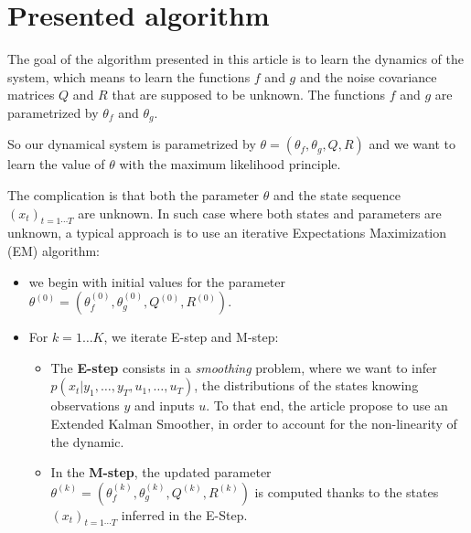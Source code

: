 \section{Presented algorithm}

The goal of the algorithm presented in this article is to learn the dynamics of the system, which means to learn the functions $f$ and $g$  and the noise covariance matrices $Q$ and $R$ that are supposed to be unknown.
The functions $f$ and $g$ are parametrized by $\theta_f$ and $\theta_g$.

So our dynamical system is parametrized by $\theta = \left(\theta_f, \theta_g, Q, R \right)$ and we want to learn the value of $\theta$ with the maximum likelihood principle.

The complication is that both the parameter $\theta$ and the state sequence $(x_t)_{t=1 \cdots T}$ are unknown.
In such case where both states and parameters are unknown, a typical approach is to use an iterative Expectations Maximization (EM) algorithm:
\begin{itemize}
  \item we begin with initial values for the parameter $\theta^{(0)} = \left( \theta_f^{(0)}, \theta_g^{(0)}, Q^{(0)}, R^{(0)} \right)$.
\item For $k=1 \ldots K$, we iterate E-step and M-step:
  \begin{itemize}

    \item The \textbf{E-step} consists in a \textit{smoothing} problem, where we want to infer \\ $p(x_t | y_1,\ldots,y_T, u_1,\ldots,u_T)$, the distributions of the states knowing observations $y$ and inputs $u$.
      To that end, the article propose to use an Extended Kalman Smoother, in order to account for the non-linearity of the dynamic.
    \item In the \textbf{M-step}, the updated parameter $\theta^{(k)} = \left( \theta_f^{(k)}, \theta_g^{(k)}, Q^{(k)}, R^{(k)} \right)$ is computed thanks to the states $(x_t)_{t=1 \cdots T}$ inferred in the E-Step.
  \end{itemize}
\end{itemize}
